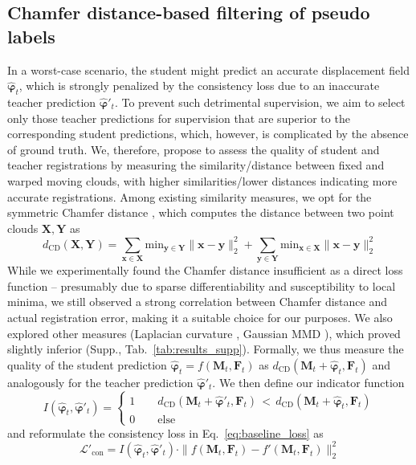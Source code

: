 \documentclass[runningheads]{llncs}
\begin{document}
\subsection{Chamfer distance-based filtering of pseudo labels}
In a worst-case scenario, the student might predict an accurate displacement field $\hat{\boldsymbol{\varphi}}_t$, which is strongly penalized by the consistency loss due to an inaccurate teacher prediction $\hat{\boldsymbol{\varphi}}'_t$.
To prevent such detrimental supervision, we aim to select only those teacher predictions for supervision that are superior to the corresponding student predictions, which, however, is complicated by the absence of ground truth.
We, therefore, propose to assess the quality of student and teacher registrations by measuring the similarity/distance between fixed and warped moving clouds, with higher similarities/lower distances indicating more accurate registrations.
Among existing similarity measures, we opt for the symmetric Chamfer distance \cite{wu2020pointpwc}, which computes the distance between two point clouds $\boldsymbol{X},\boldsymbol{Y}$ as
\begin{equation}
    d_{\mathrm{CD}}(\boldsymbol{X},\boldsymbol{Y})=\sum_{\boldsymbol{x}\in\boldsymbol{X}}\mathrm{min}_{\boldsymbol{y}\in\boldsymbol{Y}}\|\boldsymbol{x}-\boldsymbol{y}\|_2^2+\sum_{\boldsymbol{y}\in\boldsymbol{Y}}\mathrm{min}_{\boldsymbol{x}\in\boldsymbol{X}}\|\boldsymbol{x}-\boldsymbol{y}\|_2^2
\end{equation}
While we experimentally found the Chamfer distance insufficient as a direct loss function -- presumably due to sparse differentiability and susceptibility to local minima, we still observed a strong correlation between Chamfer distance and actual registration error, making it a suitable choice for our purposes.
We also explored other measures (Laplacian curvature \cite{wu2020pointpwc}, Gaussian MMD \cite{feydy2020geometric}), which proved slightly inferior (Supp., Tab.~\ref{tab:results_supp}).
Formally, we thus measure the quality of the student prediction $\hat{\boldsymbol{\varphi}}_t=f(\boldsymbol{M}_t,\boldsymbol{F}_t)$ as $d_{\mathrm{CD}}(\boldsymbol{M}_t+\hat{\boldsymbol{\varphi}}_t,\boldsymbol{F}_t)$ and analogously for the teacher prediction $\hat{\boldsymbol{\varphi}}'_t$.
We then define our indicator function
\begin{equation}
    I(\hat{\boldsymbol{\varphi}}_t,\hat{\boldsymbol{\varphi}}'_t)=
    \begin{cases}
    1\qquad d_{\mathrm{CD}}(\boldsymbol{M}_t+\hat{\boldsymbol{\varphi}}'_t,\boldsymbol{F}_t)\, <\, d_{\mathrm{CD}}(\boldsymbol{M}_t+\hat{\boldsymbol{\varphi}}_t,\boldsymbol{F}_t)\\
    0\qquad \mathrm{else}
    \end{cases}
\end{equation}
and reformulate the consistency loss in Eq.~\ref{eq:baseline_loss} as
\begin{equation}
    \mathcal{L}'_{\mathrm{con}}=I(\hat{\boldsymbol{\varphi}}_t,\hat{\boldsymbol{\varphi}}'_t)\cdot\|f(\boldsymbol{M}_t,\boldsymbol{F}_t)-f'(\boldsymbol{M}_t,\boldsymbol{F}_t)\|_2^2
\end{equation}
\end{document}
